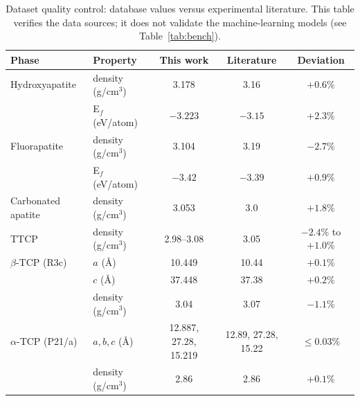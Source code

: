 \documentclass[11pt,a4paper]{article}
\begin{document}
\begin{table}[ht]
\centering\small
\caption{Dataset quality control: database values versus experimental literature. This table verifies the data sources; it does not validate the machine-learning models (see Table~\ref{tab:bench}).}
\label{tab:val}
\begin{tabular}{llccc}
\toprule
Phase & Property & This work & Literature & Deviation \\
\midrule
Hydroxyapatite & density (g/cm$^3$) & 3.178 & 3.16 & $+0.6$\% \\
 & E$_f$ (eV/atom) & $-3.223$ & $-3.15$ & $+2.3$\% \\
Fluorapatite & density (g/cm$^3$) & 3.104 & 3.19 & $-2.7$\% \\
 & E$_f$ (eV/atom) & $-3.42$ & $-3.39$ & $+0.9$\% \\
Carbonated apatite & density (g/cm$^3$) & 3.053 & 3.0 & $+1.8$\% \\
TTCP & density (g/cm$^3$) & 2.98--3.08 & 3.05 & $-2.4$\% to $+1.0$\% \\
$\beta$-TCP (R3c) & $a$ (\AA) & 10.449 & 10.44 & $+0.1$\% \\
 & $c$ (\AA) & 37.448 & 37.38 & $+0.2$\% \\
 & density (g/cm$^3$) & 3.04 & 3.07 & $-1.1$\% \\
$\alpha$-TCP (P21/a) & $a, b, c$ (\AA) & 12.887, 27.28, 15.219 & 12.89, 27.28, 15.22 & $\leq 0.03$\% \\
 & density (g/cm$^3$) & 2.86 & 2.86 & $+0.1$\% \\
\bottomrule
\end{tabular}
\end{table}
\end{document}
